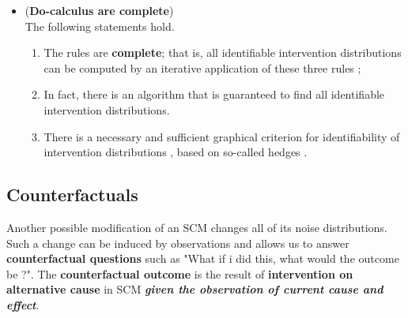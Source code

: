 \documentclass[11pt]{article}
\begin{document}
\begin{itemize}
\item 
\begin{theorem}(\textbf{Do-calculus are complete}) \citep{peters2017elements}\\
The following statements hold.
\begin{enumerate}
\item The rules are \textbf{complete}; that is, all identifiable intervention distributions can
be computed by an iterative application of these three rules \citep{huang2006pearl, shpitser2006identification};

\item In fact, there is an algorithm  that is guaranteed \citep{huang2006pearl, shpitser2006identification} to find all identifiable
intervention distributions. 

\item There is a necessary and sufficient graphical criterion for identifiability of
intervention distributions \citep{shpitser2006identification}, based on
so-called hedges \citep{huang2006pearl}.
\end{enumerate}
\end{theorem}
\end{itemize}

\subsection{Counterfactuals}
Another possible modification of an SCM changes all of its noise distributions. Such a change can be induced by observations and allows us to answer \textbf{counterfactual questions} such as "What if i did this, what would the outcome be ?". The \textbf{counterfactual outcome} is the result of \textbf{intervention on alternative cause} in SCM \emph{\textbf{given the observation of current cause and effect}}.
\end{document}

